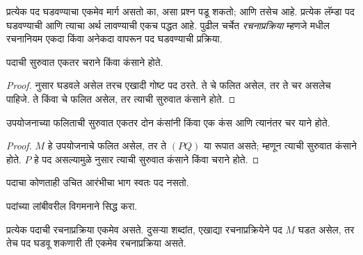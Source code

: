 \documentclass[../../../include/open-logic-section]{subfiles}
\begin{document}

प्रत्येक पद घडवण्याचा एकमेव मार्ग असतो का, असा प्रश्न
पडू शकतो; आणि तसेच आहे. प्रत्येक लॅम्डा पद घडवण्याची
आणि त्याचा अर्थ लावण्याची एकच पद्धत आहे. पुढील चर्चेत
\emph{रचनाप्रक्रिया} म्हणजे 
मधील रचनानियम एकदा किंवा अनेकदा वापरून पद घडवण्याची
प्रक्रिया.

\begin{lem}
पदाची सुरुवात एकतर चराने किंवा कंसाने होते.
\end{lem}

\begin{proof}
 नुसार घडवले असेल तरच एखादी
गोष्ट पद ठरते. ते  चे फलित
असेल, तर ते चर असलेच पाहिजे. ते
 किंवा
 चे फलित असेल, तर
त्याची सुरुवात कंसाने होते.
\end{proof}

\begin{lem}
उपयोजनाच्या फलिताची सुरुवात एकतर दोन कंसांनी किंवा
एक कंस आणि त्यानंतर चर याने होते.
\end{lem}

\begin{proof}
$M$ हे उपयोजनाचे फलित असेल, तर ते $(PQ)$ या रूपात
असते; म्हणून त्याची सुरुवात कंसाने होते. $P$ हे पद
असल्यामुळे  नुसार त्याची
सुरुवात कंसाने किंवा चराने होते.
\end{proof}

\begin{lem}
पदाचा कोणताही उचित आरंभीचा भाग स्वतः पद नसतो.
\end{lem}

\begin{prob}
पदांच्या लांबीवरील विगमनाने
 सिद्ध करा.
\end{prob}

\begin{prop}[एकमेव वाचनीयता] 
प्रत्येक पदाची रचनाप्रक्रिया एकमेव असते. दुसऱ्या
शब्दांत, एखाद्या रचनाप्रक्रियेने पद $M$ घडत असेल,
तर तेच पद घडवू शकणारी ती एकमेव रचनाप्रक्रिया असते.
\end{prop}
\end{document}
